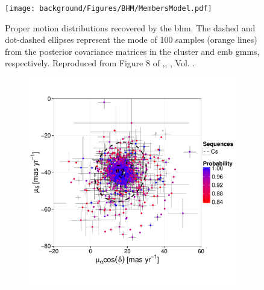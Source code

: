 \begin{figure}[ht!]
\begin{center}
\texttt{[image: background/Figures/BHM/MembersModel.pdf]}
\caption{Proper motion distributions recovered by the \gls{bhm}. The dashed and dot-dashed ellipses represent the mode of 100 samples (orange lines) from the posterior covariance matrices in the cluster and \gls{emb} \glspl{gmm}, respectively. Reproduced from Figure 8 of \citet{Olivares2017},\textit{}, , Vol. .}
\label{fig:PM}
\end{center}
\end{figure}

\begin{figure}[ht!]
    \centering
    \begin{subfigure}[t]{0.45\textwidth}
    \centering
       \includegraphics[page=2,width=\textwidth]{background/Figures/BHM/Cs_members.pdf}
        \caption{}
    \end{subfigure}
    \begin{subfigure}[t]{0.45\textwidth}
    \centering

\end{subfigure}
\end{figure}
